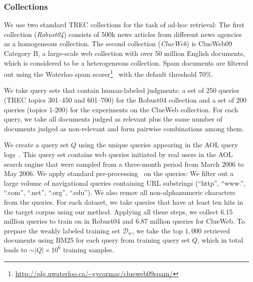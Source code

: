 \subsubsection{Collections}
We use two standard TREC collections for the task of ad-hoc retrieval: The first collection (\emph{Robust04}) consists of 500k news articles from different news agencies as a homogeneous collection. The second collection (\emph{ClueWeb}) is ClueWeb09 Category B, a large-scale web collection with over 50 million English documents, which is considered to be a heterogeneous collection. Spam documents are filtered out using the Waterloo spam scorer\footnote{\url{http://plg.uwaterloo.ca/~gvcormac/clueweb09spam/}}~\citep{Cormack:2011} with the default threshold $70\%$.

We take query sets that contain human-labeled judgments: a set of 250 queries (TREC topics 301--450 and 601--700) for the Robust04 collection and a set of 200 queries (topics 1-200) for the experiments on the ClueWeb collection.
For each query, we take all documents judged as relevant plus the same number of documents judged as non-relevant and form pairwise combinations among them.

We create a query set $Q$ using the unique queries appearing in the AOL query logs~\citep{Pass:2006}. 
This query set contains web queries initiated by real users in the AOL search engine that were sampled from a three-month period from March 2006 to May 2006. 
We apply standard pre-processing~\citep{Dehghani:2017:SIGIR,Dehghani2017:CIKM} on the queries: We filter out a large volume of navigational queries containing URL substrings (``http'', ``www.'', ``.com'', ``.net'', ``.org'', ``.edu''). We also remov all non-alphanumeric characters from the queries. For each dataset, we take queries that have at least ten hits in the target corpus using our \wa method. Applying all these steps, we collect 6.15 million queries to train on in Robust04 and 6.87 million queries for ClueWeb.
To prepare the weakly labeled training set $\mathcal{D}_w$, we take the top $1,000$ retrieved documents using BM25 for each query from training query set $Q$, which in total leads to ${\sim}|Q|\times 10^6$ training samples. 

